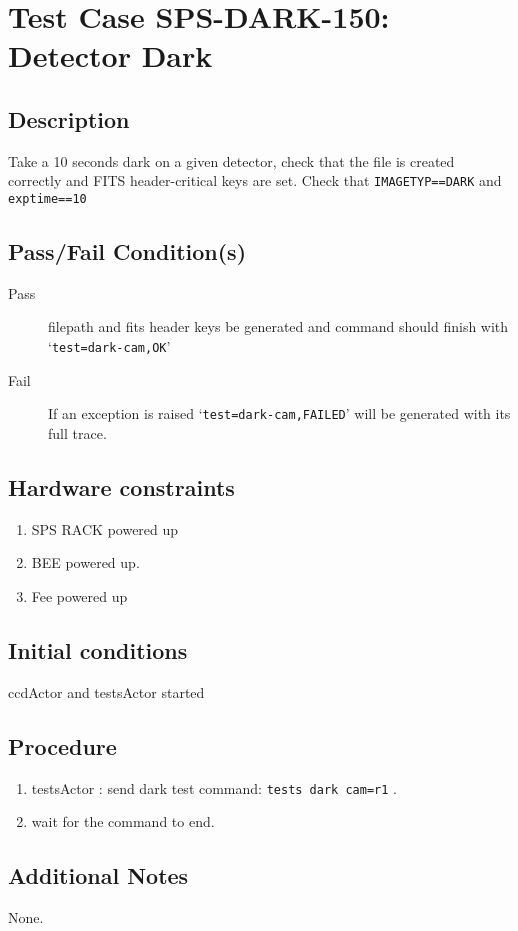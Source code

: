 \section{Test Case SPS-DARK-150: Detector Dark}

\subsection{Description}

Take a 10 seconds dark on a given detector, check that the file is created correctly 
and FITS header-critical keys are set.
Check that \texttt{IMAGETYP==DARK} and \texttt{exptime==10}

\subsection{Pass/Fail Condition(s)}

\begin{description}
\item [Pass] filepath and fits header keys be generated and command should finish with `\texttt{test=dark-cam,OK}'
\item [Fail] If an exception is raised `\texttt{test=dark-cam,FAILED}' will be generated with its full trace.

\end{description}

\subsection{Hardware constraints}

\begin{enumerate}
    \item SPS RACK powered up
    \item \acrshort{BEE} powered up.
    \item Fee powered up
\end{enumerate}

\subsection{Initial conditions}

ccdActor and testsActor started

\subsection{Procedure}

\begin{enumerate}
    \item testsActor : send dark test command: \texttt{tests dark cam=r1} .
    \item wait for the command to end.
\end{enumerate}

\subsection{Additional Notes}
None.
